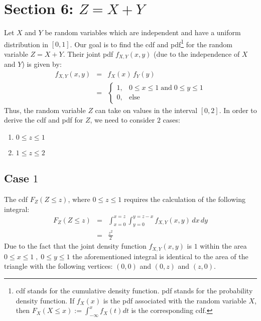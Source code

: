\documentclass[12pt]{article}
\title{\centering{Notes to Hands-on Intro to R}}
\author{Wim R.\,M.\, Cardoen\\
	Center for High-Performance Computing (CHPC)\\
	University of Utah}
\theoremstyle{definition}
\theoremstyle{remark}
\begin{document}
\date{\today}
\maketitle
\thispagestyle{empty}
\pagestyle{plain}
\setcounter{page}{1}
\renewcommand \thesection{\Roman{section}}

\section*{Section 6: $Z=X+Y$}
Let $X$ and $Y$ be random variables which are independent and have a uniform distribution in $[0,1]$.
Our goal is to find the cdf and pdf\footnote{cdf stands for the cumulative density function. pdf stands for the probability density function. 
If $f_X(x)$ is the pdf associated with the random variable $X$, then $F_X(X\le x):= \int_{-\infty}^x f_X(t) dt$ is the corresponding cdf.} for the random variable $Z=X+Y$. \newline
Their joint pdf $f_{X,Y}(x,y)$ (due to the independence of $X$ and $Y$) is given by:
\begin{eqnarray}
	f_{X,Y}(x,y) & = &f_X(x)\,f_Y(y) \nonumber \\
		     & = & \begin{cases}
			 1, & 0\le x \le 1\; \text{and} \;0\le y \le 1 \nonumber  \\
			     0, & \text{else}
		     \end{cases}    
\end{eqnarray}	
Thus, the random variable $Z$ can take on values in the interval $[0,2]$.
In order to derive the cdf and pdf for $Z$, we need to consider $2$ cases:
\begin{enumerate}
    \item $0\le z \le 1$
    \item $1 \le z \le 2$	    
\end{enumerate}		

\subsection*{Case $1$}
The cdf $F_Z(Z\le z)$, where $0\le z \le 1$ requires 
the calculation of the following integral:
\begin{eqnarray}
        F_Z(Z \le z) &= & \int_{x=0}^{x=z} \int_{y=0}^{y=z-x} f_{X,Y}(x,y)\,dx\,dy \nonumber \\
              & =& \frac{z^2}{2} \nonumber
\end{eqnarray} 
Due to the fact that the joint density function $f_{X,Y}(x,y)$ is $1$ within the area $0\le x \le 1\; , \;0\le y \le 1$ the 
aforementioned integral is identical to the area of the triangle with the following vertices:
$(0,0)$ and $(0,z)$ and $(z,0)$. 
\end{document}
